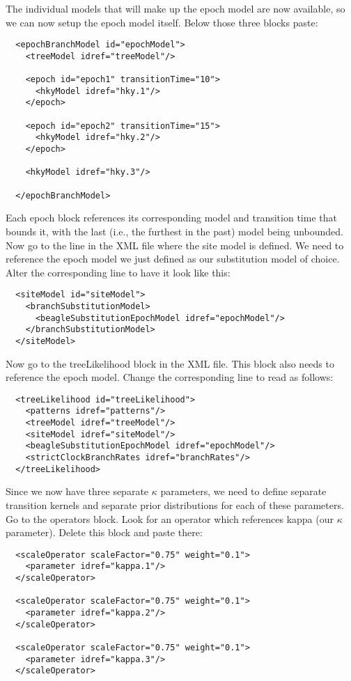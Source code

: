 The individual models that will make up the epoch model are now available, so we can now setup the epoch model itself.
Below those three blocks paste:

\begin{lstlisting}
  <epochBranchModel id="epochModel">
    <treeModel idref="treeModel"/>

    <epoch id="epoch1" transitionTime="10">
      <hkyModel idref="hky.1"/>
    </epoch>

    <epoch id="epoch2" transitionTime="15">
      <hkyModel idref="hky.2"/>
    </epoch>

    <hkyModel idref="hky.3"/>

  </epochBranchModel>
\end{lstlisting}

Each {\color{darkblue}epoch} block references its corresponding model and transition time that bounds it, with the last (i.e., the furthest in the past) model being unbounded.
Now go to the line in the XML file where the site model is defined.
We need to reference the epoch model we just defined as our substitution model of choice.
Alter the corresponding line to have it look like this:

\begin{lstlisting}
  <siteModel id="siteModel">
    <branchSubstitutionModel> 
      <beagleSubstitutionEpochModel idref="epochModel"/>
    </branchSubstitutionModel> 
  </siteModel>
\end{lstlisting}

Now go to the {\color{darkblue}treeLikelihood} block in the XML file. 
This block also needs to reference the epoch model.
Change the corresponding line to read as follows:

\begin{lstlisting}
  <treeLikelihood id="treeLikelihood">
    <patterns idref="patterns"/>
    <treeModel idref="treeModel"/>
    <siteModel idref="siteModel"/>
    <beagleSubstitutionEpochModel idref="epochModel"/>  
    <strictClockBranchRates idref="branchRates"/>
  </treeLikelihood>
\end{lstlisting}

Since we now have three separate $\kappa$ parameters, we need to define separate transition kernels and separate prior distributions for each of these parameters.
Go to the {\color{darkblue}operators} block. 
Look for an operator which references kappa (our $\kappa$ parameter).
Delete this block and paste there:

\begin{lstlisting}
  <scaleOperator scaleFactor="0.75" weight="0.1">
    <parameter idref="kappa.1"/>
  </scaleOperator>
		
  <scaleOperator scaleFactor="0.75" weight="0.1">
    <parameter idref="kappa.2"/>
  </scaleOperator>
		
  <scaleOperator scaleFactor="0.75" weight="0.1">
    <parameter idref="kappa.3"/>
  </scaleOperator>
\end{lstlisting}

